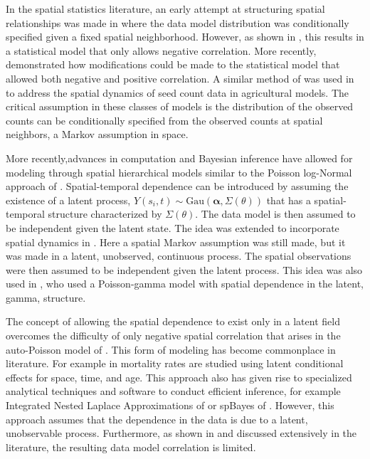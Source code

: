 \documentclass[11pt]{isuthesis}
\begin{document}
In the spatial statistics literature, an early attempt at structuring spatial relationships was made in \cite{besag1974spatial} where the data model distribution was conditionally specified given a fixed spatial neighborhood.  However, as shown in \cite{besag1974spatial}, this results in a statistical model that only allows negative correlation.  More recently, \cite{kaiser1997modeling} demonstrated how modifications could be made to the statistical model that allowed both negative and positive correlation.  A similar method of was used in \cite{augustin2006using} to address the spatial dynamics of seed count data in agricultural models.  The critical assumption in these classes of models is the distribution of the observed counts can be conditionally specified from the observed counts at spatial neighbors, a Markov assumption in space.

More recently,advances in computation and Bayesian inference have allowed for modeling through spatial hierarchical models similar to the Poisson log-Normal approach of \cite{aitchison1989multivariate}. Spatial-temporal dependence can be introduced by assuming the existence of a latent process, $Y(s_i,t)\sim \mbox{Gau}(\boldsymbol{\alpha},\Sigma(\theta))$ that has a spatial-temporal structure characterized by $\Sigma(\theta)$.  The data model is then assumed to be independent given the latent state. The idea was extended to incorporate spatial dynamics in \cite{besag1991bayesian}.  Here a spatial Markov assumption was still made, but it was made in a latent, unobserved, continuous process.  The spatial observations were then assumed to be independent given the latent process.  This idea was also used in \cite{wolpert1998poisson}, who used a Poisson-gamma model with spatial dependence in the latent, gamma, structure.

The concept of allowing the spatial dependence to exist only in a latent field overcomes the difficulty of only negative spatial correlation that arises in the auto-Poisson model of \cite{besag1974spatial}.  This form of modeling has become commonplace in literature.  For example in \cite{goicoa2016age} mortality rates are studied using latent conditional effects for space, time, and age.  This approach also has given rise to specialized analytical techniques and software to conduct efficient inference, for example Integrated Nested Laplace Approximations of \cite{rue2009approximate} or spBayes of \cite{finley2007spbayes}.  However, this approach assumes that the dependence in the data is due to a latent, unobservable process.  Furthermore, as shown in \cite{aitchison1989multivariate} and discussed extensively in the literature, the resulting data model correlation is limited.
\end{document}
